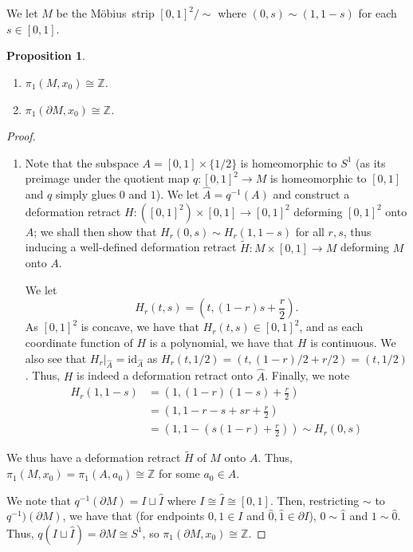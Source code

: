 \documentclass[english]{article}
\newcommand{\evat}[3]{\left. #1\right|_{#2}^{#3}}
\newcommand{\restr}[2]{\evat{#1}{#2}{}}
\newcommand{\ZZ}{\mathbb{Z}}
\newcommand{\prob}[1]{\setcounter{section}{#1-1}\section{}}
\newtheorem*{prop*}{Proposition}
\theoremstyle{remark}
\theoremstyle{definition}
\newcommand{\id}{\mathrm{id}}
\newcommand{\del}{\partial}
\newcommand{\mo}{M\"obius~}
\begin{document}
\prob{2}
We let $M$ be the \mo strip $[0,1]^2/\sim$ where $(0,s)\sim (1,1-s)$ for each $s\in [0,1]$.
\begin{prop*}
	\begin{enumerate}[label=\textit{(i)}]
		\item $\pi_1(M,x_0)\cong \ZZ$.
		\item $\pi_1(\del M,x_0)\cong \ZZ$. 
	\end{enumerate}
\end{prop*}
\begin{proof}
	\begin{enumerate}[label=\textit{(i)}]
	\item	Note that the subspace $A= [0,1]\times\{1/2\}$ is homeomorphic to $S^1$ (as its preimage under the quotient map $q:[0,1]^2\to M$ is homeomorphic to $[0,1]$ and $q$ simply glues $0$ and $1$). We let $\hat{A}=q^{-1}(A)$ and construct a deformation retract $H:([0,1]^2)\times [0,1]\to [0,1]^2$ deforming $[0,1]^2$ onto $A$; we shall then show that $H_r(0,s)\sim H_r(1,1-s)$ for all $r,s$, thus inducing a well-defined deformation retract $\tilde{H}:M\times [0,1]\to M$ deforming $M$ onto $A$.
	
	We let $$H_r(t,s)=(t,(1-r)s+\frac{r}{2}).$$
	As $[0,1]^2$ is concave, we have that $H_r(t,s)\in [0,1]^2$, and as each coordinate function of $H$ is a polynomial, we have that $H$ is continuous. We also see that $\restr{H_r}{\hat{A}}=\id_{\hat{A}}$ as $H_r(t,1/2)=(t,(1-r)/2+r/2)=(t,1/2)$. Thus, $H$ is indeed a deformation retract onto $\hat{A}$. Finally, we note \begin{align*}H_r(1,1-s)&=\left(1,(1-r)(1-s)+\frac{r}{2}\right)\\&=\left(1,1-r-s+sr+\frac{r}{2}\right)
	\\&=\left(1,1-(s(1-r)+\frac{r}{2})\right)\sim H_r(0,s)\end{align*}
	\end{enumerate}
We thus have a deformation retract $\tilde{H}$ of $M$ onto $A$. Thus, $\pi_1(M,x_0)=\pi_1(A,a_0)\cong\ZZ$ for some $a_0\in A$. 

\item We note that $q^{-1}(\del M)=I\sqcup \hat{I}$ where $I\cong \hat{I}\cong [0,1]$. Then, restricting $\sim$ to $q^{-1})(\del M)$, we have that (for endpoints $0,1\in I$ and $\hat{0},\hat{1}\in \del I$), $0\sim \hat{1}$ and $1\sim \hat{0}$. Thus, $q(I\sqcup \hat{I})=\del M\cong S^1$, so $\pi_1(\del M,x_0)\cong \ZZ$.
\end{proof}
\end{document}
